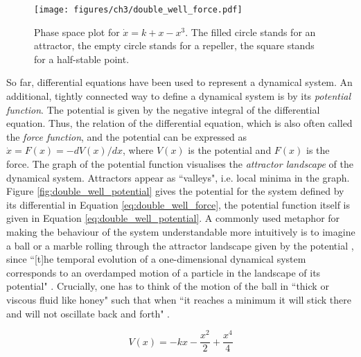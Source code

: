 \begin{figure}[b]
\texttt{[image: figures/ch3/double\_well\_force.pdf]}
\caption[Phase space plot for $\dot{x} = k + x - x^3$.]{Phase space plot for $\dot{x} = k + x - x^3$. The filled circle stands for an attractor, the empty circle stands for a repeller, the square stands for a half-stable point.}
\label{fig:double_well_force}
\end{figure}

So far, differential equations have been used to represent a dynamical system. An additional, tightly connected way to define a dynamical system is by its \emph{potential function}. The potential is given by the negative integral of the differential equation. Thus, the relation of the differential equation, which is also often called the \emph{force function}, and the potential can be expressed as $\dot{x} = F(x) = -dV(x)/dx$, where $V(x)$ is the potential and $F(x)$ is the force. The graph of the potential function visualises the \emph{attractor landscape} of the dynamical system. Attractors appear as ``valleys", i.e. local minima in the graph. Figure \ref{fig:double_well_potential} gives the potential for the system defined by its differential in Equation \ref{eq:double_well_force}, the potential function itself is given in Equation \ref{eq:double_well_potential}. A commonly used metaphor for making the behaviour of the system understandable more intuitively is to imagine a ball or a marble rolling through the attractor landscape given by the potential \citep{HakenLevi2012}, since ``[t]he temporal evolution of a one-dimensional dynamical system corresponds to an overdamped motion of a particle in the landscape of its potential" \citep[22]{Fuchs2013}. Crucially, one has to think of the motion of the ball in ``thick or viscous fluid like honey" such that when ``it reaches a minimum it will stick there and will not oscillate back and forth" \citep[22]{Fuchs2013}.

\begin{equation}
V(x) = - kx - \frac{x^2}{2} + \frac{x^4}{4}
\label{eq:double_well_potential}
\end{equation}

